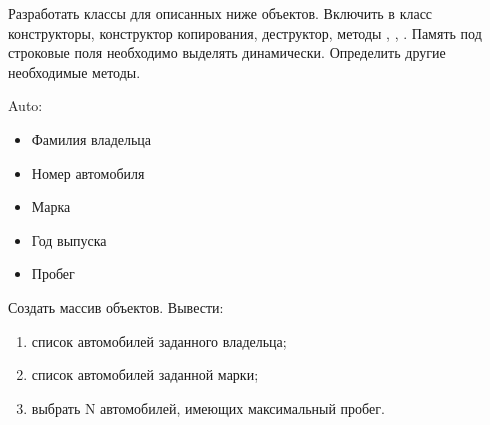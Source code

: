 
Разработать классы для описанных ниже объектов. Включить в класс
конструкторы, конструктор копирования, деструктор, методы ,
, . Память под строковые поля необходимо выделять
динамически. Определить другие необходимые методы.

Auto:
\begin{itemize}
	\item Фамилия владельца
	\item Номер автомобиля
	\item Марка
	\item Год выпуска
	\item Пробег
\end{itemize}

Создать массив объектов. Вывести:
\begin{enumerate}
	\item список автомобилей заданного владельца;
	\item список автомобилей заданной марки;
	\item выбрать N автомобилей, имеющих максимальный пробег.
\end{enumerate}
